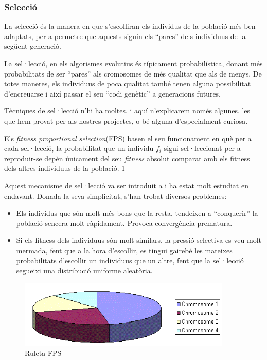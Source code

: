 \documentclass[titlepage,a4paper,12pt]{book}
\begin{document}
\subsubsection{Selecció}
La selecció és la manera en que s'escolliran els individus de la població més
ben adaptats, per a permetre que aquests siguin els ``pares'' dels individuus de
la següent generació.

La sel·lecció, en els algorismes evolutius és típicament probabilística, donant
més probabilitats de ser ``pares'' als cromosomes de més qualitat que als de
menys.  De totes maneres, els individuus de poca qualitat també tenen alguna
possibilitat d'encreuarse i així passar el seu ``codi genètic'' a generacions
futures.

Tècniques de sel·lecció n'hi ha moltes, i aquí n'explicarem només algunes, les
que hem provat per als nostres projectes, o bé alguna d'especialment curiosa.

Els \emph{fitness proportional selection}(FPS) basen el seu funcionament en què
per a cada sel·lecció, la probabilitat que un individu $f_i$ sigui sel·leccionat
per a reproduir-se depèn únicament del seu \emph{fitness} absolut comparat amb
els fitness dels altres individuus de la població. \ref{fig:rwsgraph} 

Aquest mecanisme de sel·lecció va ser introduit a \cite{H75} i ha estat molt
estudiat en endavant.  Donada la seva simplicitat, s'han trobat diversos
problemes:

\begin{itemize}
	\item Els individus que són molt més bons que la resta, tendeixen a
	``conquerir'' la població sencera molt ràpidament. Provoca convergència
	prematura.
	\item Si els fitness dels individuus són molt similars, la pressió selectiva
	es veu molt mermada, fent que a la hora d'escollir, es tingui gairebé les
	mateixes probabilitats d'escollir un individuus que un altre, fent que la
	sel·lecció segueixi una distribució uniforme aleatòria.
\end{itemize}


\begin{figure} \centering \includegraphics[width=4in]{intro/rwsgraph.png}
\caption{\label{fig:rwsgraph}Ruleta FPS}
\end{figure}
\end{document}
